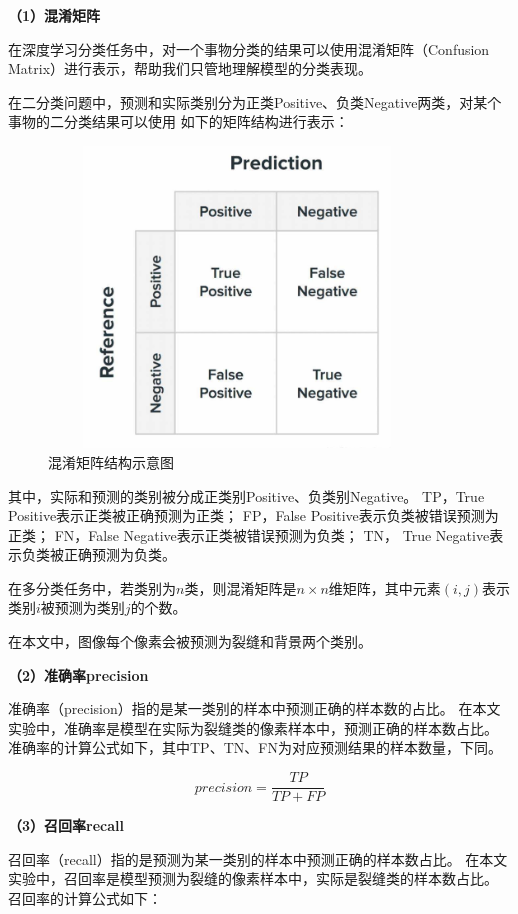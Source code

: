 \textbf{（1）混淆矩阵}

在深度学习分类任务中，对一个事物分类的结果可以使用混淆矩阵（Confusion Matrix）进行表示，帮助我们只管地理解模型的分类表现。

在二分类问题中，预测和实际类别分为正类Positive、负类Negative两类，对某个事物的二分类结果可以使用
如下的矩阵结构进行表示：

\begin{figure}[H]
	\includegraphics[width=10cm, height=8cm]{pic/confusion-matrix.png}
	\caption{混淆矩阵结构示意图}
	\label{confusion-matrix}
\end{figure}

其中，实际和预测的类别被分成正类别Positive、负类别Negative。
TP，True Positive表示正类被正确预测为正类；
FP，False Positive表示负类被错误预测为正类；
FN，False Negative表示正类被错误预测为负类；
TN， True Negative表示负类被正确预测为负类。

在多分类任务中，若类别为$n$类，则混淆矩阵是$n\times n$维矩阵，其中元素$(i,j)$表示类别$i$被预测为类别$j$的个数。

在本文中，图像每个像素会被预测为裂缝和背景两个类别。

\textbf{（2）准确率precision}

准确率（precision）指的是某一类别的样本中预测正确的样本数的占比。
在本文实验中，准确率是模型在实际为裂缝类的像素样本中，预测正确的样本数占比。
准确率的计算公式如下，其中TP、TN、FN为对应预测结果的样本数量，下同。

\begin{equation}
    precision=\frac{TP}{TP+FP}
\end{equation}

\textbf{（3）召回率recall}

召回率（recall）指的是预测为某一类别的样本中预测正确的样本数占比。
在本文实验中，召回率是模型预测为裂缝的像素样本中，实际是裂缝类的样本数占比。
召回率的计算公式如下：

